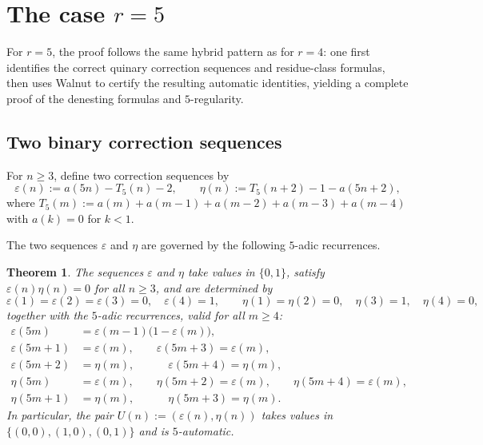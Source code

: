 \documentclass[12pt]{article}
\newtheorem{theorem}{Theorem}[section]
\theoremstyle{definition}
\theoremstyle{remark}
\begin{document}
\section{The case $r=5$}\label{sec:r5}

For $r=5$, the proof follows the same hybrid pattern as for $r=4$:
one first identifies the correct quinary correction sequences and
residue-class formulas, then uses Walnut to certify the resulting
automatic identities, yielding a complete proof of the denesting
formulas and $5$-regularity.

\subsection{Two binary correction sequences}

For $n\ge 3$, define two correction sequences by
\begin{equation}\label{eq:r5_def}
  \varepsilon(n) := a(5n) - T_5(n) - 2,
  \qquad
  \eta(n) := T_5(n+2) - 1 - a(5n+2),
\end{equation}
where $T_5(m):=a(m)+a(m-1)+a(m-2)+a(m-3)+a(m-4)$ with $a(k)=0$ for $k<1$.

The two sequences $\varepsilon$ and $\eta$ are governed by the following $5$-adic recurrences.

\begin{theorem}\label{thm:r5eps}
The sequences $\varepsilon$ and $\eta$ take values in $\{0,1\}$,
satisfy $\varepsilon(n)\eta(n)=0$ for all $n\ge 3$, and are determined by
\[
  \varepsilon(1)=\varepsilon(2)=\varepsilon(3)=0,\quad \varepsilon(4)=1,
  \qquad
  \eta(1)=\eta(2)=0,\quad \eta(3)=1,\quad \eta(4)=0,
\]
together with the $5$-adic recurrences, valid for all $m\ge 4$:
\begin{align}
  \varepsilon(5m)   &= \varepsilon(m-1)\bigl(1-\varepsilon(m)\bigr), \label{eq:r5eps0}\\
  \varepsilon(5m+1) &= \varepsilon(m),\qquad \varepsilon(5m+3) = \varepsilon(m), \label{eq:r5eps13}\\
  \varepsilon(5m+2) &= \eta(m),\qquad\quad \varepsilon(5m+4) = \eta(m), \label{eq:r5eps24}\\
  \eta(5m)          &= \varepsilon(m),\qquad \eta(5m+2) = \varepsilon(m),\qquad
                       \eta(5m+4) = \varepsilon(m), \label{eq:r5eta024}\\
  \eta(5m+1)        &= \eta(m),\qquad\quad \eta(5m+3) = \eta(m). \label{eq:r5eta13}
\end{align}
In particular, the pair $U(n):=(\varepsilon(n),\eta(n))$ takes values in
$\{(0,0),(1,0),(0,1)\}$ and is $5$-automatic.
\end{theorem}
\end{document}
